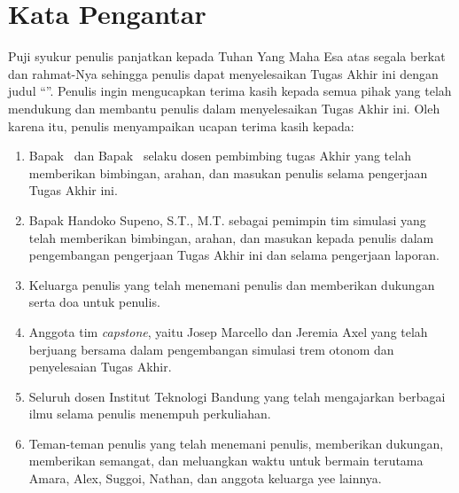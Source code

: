\chapter*{Kata Pengantar}

Puji syukur penulis panjatkan kepada Tuhan Yang Maha Esa atas segala berkat dan
rahmat-Nya sehingga penulis dapat menyelesaikan Tugas Akhir ini dengan judul
``\thetitle''. Penulis ingin mengucapkan terima kasih kepada semua pihak yang
telah mendukung dan membantu penulis dalam menyelesaikan Tugas Akhir ini.
Oleh karena itu, penulis menyampaikan ucapan terima kasih kepada:

\begin{enumerate}
	\item Bapak \advisoronename\verb| |dan Bapak \advisortwoname\verb| |selaku
	dosen pembimbing tugas Akhir yang telah memberikan bimbingan, arahan, dan
	masukan penulis selama pengerjaan Tugas Akhir ini.
	\item Bapak Handoko Supeno, S.T., M.T. sebagai pemimpin tim simulasi yang
	telah memberikan bimbingan, arahan, dan masukan kepada penulis dalam
	pengembangan pengerjaan Tugas Akhir ini dan selama pengerjaan laporan.
	\item Keluarga penulis yang telah menemani penulis dan memberikan dukungan
	serta doa untuk penulis.
	\item Anggota tim \textit{capstone}, yaitu Josep Marcello dan Jeremia Axel
	yang telah berjuang bersama dalam pengembangan simulasi trem otonom dan
	penyelesaian Tugas Akhir.
	\item Seluruh dosen Institut Teknologi Bandung yang telah mengajarkan berbagai
	ilmu selama penulis menempuh perkuliahan.
	\item Teman-teman penulis yang telah menemani penulis, memberikan dukungan,
	memberikan semangat, dan meluangkan waktu untuk bermain terutama Amara,
	Alex, Suggoi, Nathan, dan anggota keluarga yee lainnya.
\end{enumerate}



\clearpage
